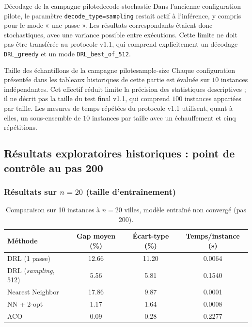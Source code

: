 \documentclass[12pt, a4paper, twoside, openright]{book}
\begin{document}
\begin{remark}{Décodage de la campagne pilote}{decode-stochastic}
Dans l'ancienne configuration pilote, le paramètre \texttt{decode\_type=sampling}
restait actif à l'inférence, y compris pour le mode « une passe ». Les résultats
correspondants étaient donc stochastiques, avec une variance possible entre
exécutions. Cette limite ne doit pas être transférée au protocole v1.1, qui
comprend explicitement un décodage \texttt{DRL\_greedy} et un mode
\texttt{DRL\_best\_of\_512}.
\end{remark}

\begin{remark}{Taille des échantillons de la campagne pilote}{sample-size}
Chaque configuration présentée dans les tableaux historiques de cette partie
est évaluée sur $10$ instances indépendantes. Cet effectif réduit limite la
précision des statistiques descriptives ; il ne décrit pas la taille du test
final v1.1, qui comprend $100$ instances appariées par taille. Les mesures de
temps répétées du protocole v1.1 utilisent, quant à elles, un sous-ensemble de
$10$ instances par taille avec un échauffement et cinq répétitions.
\end{remark}

\subsection{Résultats exploratoires historiques : point de contrôle au pas 200}
\label{sec:res-step200}

\subsubsection{Résultats sur $n=20$ (taille d'entraînement)}

\begin{table}[H]
	\centering
	\begin{tabular}{lccc}
		\toprule
		Méthode & Gap moyen (\%) & Écart-type (\%) & Temps/instance (s) \\
		\midrule
		DRL (1 passe)                & 12.66 & 11.20 & 0.0064 \\
		DRL (\textit{sampling}, 512) & 5.56  & 5.81  & 0.1540 \\
		Nearest Neighbor             & 17.86 & 9.87  & 0.0001 \\
		NN + 2-opt                   & 1.17  & 1.64  & 0.0008 \\
		ACO                          & 0.09  & 0.28  & 0.2277 \\
		\bottomrule
	\end{tabular}
	\caption{Comparaison sur 10 instances à $n=20$ villes, modèle entraîné non convergé (pas 200).}
	\label{tab:resultats-n20-batch}
\end{table}
\end{document}
